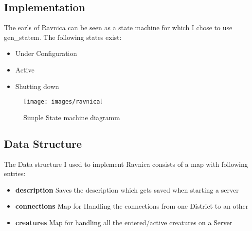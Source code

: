 \documentclass[12pt,a4paper]{article}
\begin{document}
\subsection{Implementation}
The earls of Ravnica can be seen as a state machine for which I chose to use gen\_statem.
The following states exist:
\begin{itemize}
	\item Under Configuration
	\item Active
	\item Shutting down
\end{itemize}

\begin{figure}[!htb]
	\texttt{[image: images/ravnica]}
	\caption{Simple State machine diagramm}
\end{figure}

\subsection{Data Structure}
The Data structure I used to implement Ravnica consists of a map with following entries:
\begin{itemize}
	\item \textbf{description} Saves the description which gets saved when starting a server
	\item \textbf{connections} Map for Handling the connections from one District to an other
	\item \textbf{creatures} Map for handling all the entered/active creatures on a Server
\end{itemize}


\end{document}

